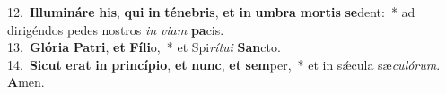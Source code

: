 {12.~}\textbf{Il}\textbf{lu}\textbf{mi}\textbf{ná}\textbf{re} \textbf{his}, \textbf{qui} \textbf{in} \textbf{té}\textbf{ne}\textbf{bris}, \textbf{et} \textbf{in} \textbf{um}\textbf{bra} \textbf{mor}\textbf{tis} \textbf{se}dent:~* ad dirigéndos pedes nostros \textit{in} \textit{vi}\textit{am} \textbf{pa}cis.\\
{13.~}\textbf{Gló}\textbf{ri}\textbf{a} \textbf{Pa}\textbf{tri}, \textbf{et} \textbf{Fí}\textbf{li}o,~* et Spi\textit{rí}\textit{tu}\textit{i} \textbf{San}cto.\\
{14.~}\textbf{Si}\textbf{cut} \textbf{e}\textbf{rat} \textbf{in} \textbf{prin}\textbf{cí}\textbf{pi}\textbf{o}, \textbf{et} \textbf{nunc}, \textbf{et} \textbf{sem}per,~* et in sǽcula sæ\textit{cu}\textit{ló}\textit{rum}. \textbf{A}men.\\
